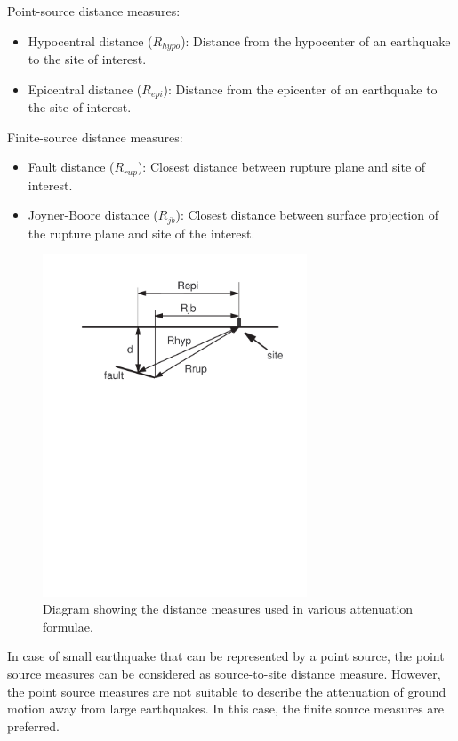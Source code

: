 Point-source distance measures:
\begin{itemize}
\item Hypocentral distance ($R_{hypo}$): Distance from the hypocenter of an earthquake to the site of interest.
\item Epicentral distance ($R_{epi}$): Distance from the epicenter of an earthquake to the site of interest.
\end{itemize}

Finite-source distance measures:
\begin{itemize}
\item Fault distance ($R_{rup}$): Closest distance between rupture plane and site of interest.
\item Joyner-Boore distance ($R_{jb}$): Closest distance between surface projection of the rupture plane and site of the interest.
\end{itemize}
\begin{figure}[htp]
 \centering {}
  
  
\includegraphics[width=0.7\textwidth]{diags/fig-hattn-distance}
\caption{Diagram showing the distance measures used in various
  attenuation formulae.}
  \label{fig:attn-distances}
\end{figure}
In case of small earthquake that can be represented by a point
source, the point source measures can be considered as
source-to-site distance measure. However, the point source measures
are not suitable to describe the attenuation of ground motion away
from large earthquakes. In this case, the finite source measures are
preferred.

